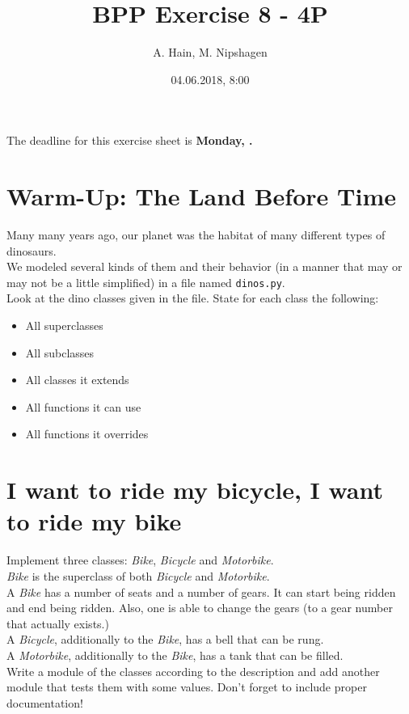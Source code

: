 
\usepackage{setspace}

\title{BPP Exercise 8 - 4P}
\author{A. Hain, M. Nipshagen}
\date{04.06.2018, 8:00}

\makeatletter
\let\thetitle\@title
\let\theauthor\@author
\let\thedate\@date
\makeatother


\newcommand\itemsub[1]{
	\begin{itemize}
		\item #1
	\end{itemize}
}





The deadline for this exercise sheet is \textbf{Monday, \thedate.}



\section{Warm-Up: The Land Before Time}
Many many years ago, our planet was the habitat of many different types of dinosaurs.\\
We modeled several kinds of them and their behavior (in a manner that may or may
not be a little simplified) in a file named \texttt{dinos.py}.\\
Look at the dino classes given in the file. State for each class the following:
\begin{itemize}
	\item{All superclasses}
	\item{All subclasses}
	\item{All classes it extends}
	\item{All functions it can use}
	\item{All functions it overrides}
\end{itemize}

\section{I want to ride my bicycle, I want to ride my bike}
Implement three classes: \textit{Bike}, \textit{Bicycle} and \textit{Motorbike}.\\
\textit{Bike} is the superclass of both \textit{Bicycle} and \textit{Motorbike}.\\
A \textit{Bike} has a number of seats and a number of gears. It can start being ridden and
end being ridden. Also, one is able to change the gears (to a gear number that
actually exists.)\\
A \textit{Bicycle}, additionally to the \textit{Bike}, has a bell that can be rung.\\
A \textit{Motorbike}, additionally to the \textit{Bike}, has a tank that can be filled.\\
Write a module of the classes according to the description and add another module
that tests them with some values. Don't forget to include proper documentation!





